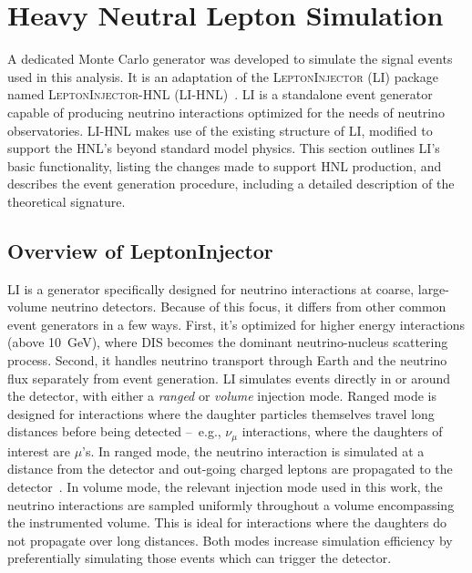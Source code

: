 \documentclass[
    aps,
    prd,
    reprint,
    amsmath,
    amssymb,
    nofootinbib,
    linenumbers,
    superscriptaddress,
    floatfix
]{revtex4-2}
\newcommand{\gev}{\giga\electronvolt}
\begin{document}

\section{\label{sec:generator}Heavy Neutral Lepton Simulation}

A dedicated Monte Carlo generator was developed to simulate the signal events used in this analysis. It is an adaptation of the \textsc{LeptonInjector} (LI) package~\cite{IceCube:2020tcq} named \textsc{LeptonInjector-HNL} (LI-HNL)~\cite{LeptonInjector-HNL}. LI is a standalone event generator capable of producing neutrino interactions optimized for the needs of neutrino observatories. LI-HNL makes use of the existing structure of LI, modified to support the HNL's beyond standard model physics.
This section outlines LI's basic functionality, listing the changes made to support HNL production, and describes the event generation procedure, including a detailed description of the theoretical signature.


\subsection{Overview of LeptonInjector}

LI is a generator specifically designed for neutrino interactions at coarse, large-volume neutrino detectors.
Because of this focus, it differs from other common event generators in a few ways.
First, it's optimized for higher energy interactions (above \SI{10}{\gev}), where DIS becomes the dominant neutrino-nucleus scattering process.
Second, it handles neutrino transport through Earth and the neutrino flux separately from event generation.
LI simulates events directly in or around the detector, with either a \textit{ranged} or \textit{volume} injection mode.
Ranged mode is designed for interactions where the daughter particles themselves travel long distances before being detected --~e.g., $\nu_\mu$ interactions, where the daughters of interest are $\mu$'s.
In ranged mode, the neutrino interaction is simulated at a distance from the detector and out-going charged leptons are propagated to the detector~\cite{IceCube:2020tcq}.
In volume mode, the relevant injection mode used in this work, the neutrino interactions are sampled uniformly throughout a volume encompassing the instrumented volume.
This is ideal for interactions where the daughters do not propagate over long distances.
Both modes increase simulation efficiency by preferentially simulating those events which can trigger the detector.
\end{document}
